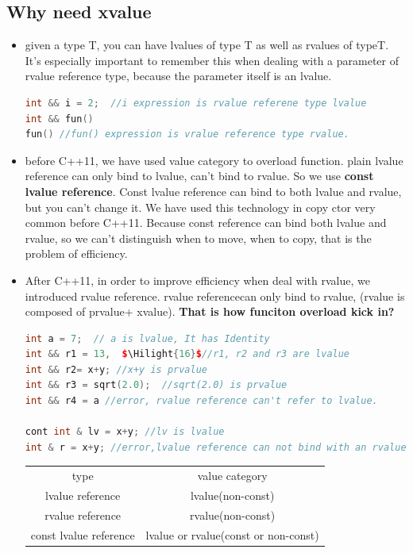 \documentclass[a4paper,11pt,twoside]{book}
\newcommand{\Hilight}[1]{\makebox[0pt][l]{\color{yellow}\rule[-3pt]{#1em}{11pt}}}
\newcommand{\Hilight}[1]{}
\renewcommand{\hline}{}
\begin{document}
\subsection{Why need xvalue}
\begin{itemize}
	\item given a type T, you can have lvalues of type T as well as rvalues of typeT. It's especially important to remember this when dealing with a parameter of rvalue reference type, because the parameter itself is an lvalue.
\begin{lstlisting}[frame=single, language=c++, mathescape=true]
int && i = 2;  //i expression is rvalue referene type lvalue
int && fun()
fun() //fun() expression is vralue reference type rvalue. 
\end{lstlisting}
	
	\item before C++11, we have used value category to overload function. plain lvalue reference can only bind to lvalue, can't bind to rvalue. So we use \textbf{const lvalue reference}.  Const lvalue reference can bind to both lvalue and rvalue, but you can't change it. We have used this technology in copy ctor very common before C++11. Because const reference can bind both lvalue and rvalue, so we can't distinguish when to move, when to copy, that is the problem of efficiency.
	
	\item After C++11, in order to improve efficiency when deal with rvalue, we introduced rvalue reference.  rvalue referencecan only bind to rvalue, (rvalue is composed of prvalue+ xvalue). \textbf{That is how funciton overload kick in?}

\begin{lstlisting}[frame=single, language=c++, mathescape=true]
int a = 7;  // a is lvalue, It has Identity
int && r1 = 13,  $\Hilight{16}$//r1, r2 and r3 are lvalue
int && r2= x+y; //x+y is prvalue
int && r3 = sqrt(2.0);  //sqrt(2.0) is prvalue
int && r4 = a //error, rvalue reference can't refer to lvalue.

cont int & lv = x+y; //lv is lvalue
int & r = x+y; //error,lvalue reference can not bind with an rvalue.
\end{lstlisting}
	
	\begin{tabular}{|c|c|}
		\hline 
		type & value category \\ 
		\hline 
		lvalue reference & lvalue(non-const)  \\ 
		\hline 
		rvalue reference &  rvalue(non-const)\\ 
		\hline 
		const lvalue reference & lvalue or rvalue(const or non-const)  \\ 
		\hline 
	\end{tabular} 
	

\end{itemize}
\end{document}
